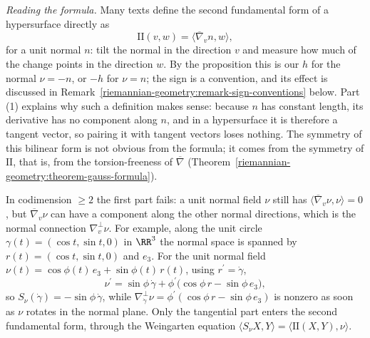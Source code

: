 \begin{remark}\label{riemannian-geometry:remark-normal-derivative}
\emph{Reading the formula.} Many texts define the second fundamental form of a hypersurface directly as
\[
\mathrm{II}(v, w) = \langle\overline{\nabla}_vn, w\rangle ,
\]
for a unit normal $n$: tilt the normal in the direction $v$ and measure how much of the change points in the direction $w$. By the proposition this is our $h$ for the normal $\nu = -n$, or $-h$ for $\nu = n$; the sign is a
convention, and its effect is discussed in Remark~\ref{riemannian-geometry:remark-sign-conventions} below. Part (1) explains why such a definition makes sense: because $n$ has constant length, its derivative has no component
along $n$, and in a hypersurface it is therefore a tangent vector, so pairing it with tangent vectors loses nothing. The symmetry of this bilinear form is not obvious from the formula; it comes from the symmetry of
$\mathrm{II}$, that is, from the torsion-freeness of $\overline{\nabla}$ (Theorem~\ref{riemannian-geometry:theorem-gauss-formula}).

In codimension $\geq 2$ the first part fails: a unit normal field $\nu$ still has $\langle\overline{\nabla}_v\nu, \nu\rangle = 0$, but $\overline{\nabla}_v\nu$ can have a component along the other normal directions, which is the normal connection
$\nabla^\perp_v\nu$. For example, along the unit circle $\gamma(t) = (\cos t, \sin t, 0)$ in $\RR^3$ the normal space is spanned by $r(t) = (\cos t, \sin t, 0)$ and $e_3$. For the unit normal field
$\nu(t) = \cos\phi(t)\,e_3 + \sin\phi(t)\,r(t)$, using $r^{\prime} = \dot\gamma$,
\[
\nu^{\prime} = \sin\phi\,\dot\gamma + \phi^{\prime}\bigl(\cos\phi\,r - \sin\phi\,e_3\bigr),
\]
so $S_\nu(\dot\gamma) = -\sin\phi\,\dot\gamma$, while $\nabla^\perp_{\dot\gamma}\nu = \phi^{\prime}(\cos\phi\,r - \sin\phi\,e_3)$ is nonzero as soon as $\nu$ rotates in the normal plane. Only the tangential part enters the second fundamental
form, through the Weingarten equation $\langle S_\nu X, Y\rangle = \langle\mathrm{II}(X, Y), \nu\rangle$.
\end{remark}

